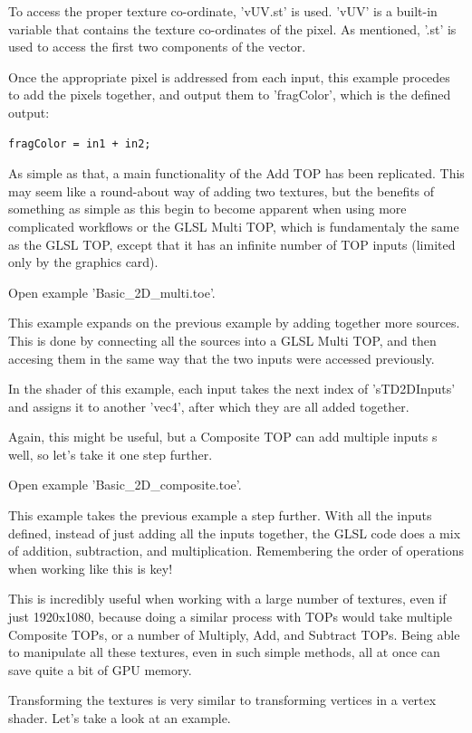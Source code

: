 \begin{fullwidth}
To access the proper texture co-ordinate, 'vUV.st' is used. 'vUV' is a built-in variable that contains the texture co-ordinates of the pixel. As mentioned, '.st' is used to access the first two components of the vector.

Once the appropriate pixel is addressed from each input, this example procedes to add the pixels together, and output them to 'fragColor', which is the defined output:

\begin{lstlisting}
fragColor = in1 + in2;
\end{lstlisting}

As simple as that, a main functionality of the Add TOP has been replicated. This may seem like a round-about way of adding two textures, but the benefits of something as simple as this begin to become apparent when using more complicated workflows or the GLSL Multi TOP, which is fundamentaly the same as the GLSL TOP, except that it has an infinite number of TOP inputs (limited only by the graphics card).

Open example 'Basic\_2D\_multi.toe'.

This example expands on the previous example by adding together more sources. This is done by connecting all the sources into a GLSL Multi TOP, and then accesing them in the same way that the two inputs were accessed previously.

In the shader of this example, each input takes the next index of 'sTD2DInputs' and assigns it to another 'vec4', after which they are all added together.

Again, this might be useful, but a Composite TOP can add multiple inputs s well, so let's take it one step further. 

Open example 'Basic\_2D\_composite.toe'.

This example takes the previous example a step further. With all the inputs defined, instead of just adding all the inputs together, the GLSL code does a mix of addition, subtraction, and multiplication. Remembering the order of operations when working like this is key! 

This is incredibly useful when working with a large number of textures, even if just 1920x1080, because doing a similar process with TOPs would take multiple Composite TOPs, or a number of Multiply, Add, and Subtract TOPs. Being able to manipulate all these textures, even in such simple methods, all at once can save quite a bit of GPU memory.

Transforming the textures is very similar to transforming vertices in a vertex shader. Let's take a look at an example.


\end{fullwidth}
